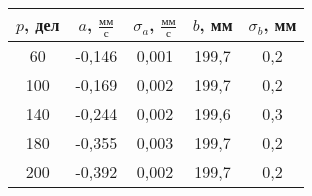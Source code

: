 \begin{tabular}[t]{|c|c|c|c|c|}
\hline
$p$, дел & $a$, $\frac{мм}{с}$ & $\sigma_a$, $\frac{мм}{с}$ & $b$, мм & $\sigma_b$, мм \\ 
\hline
60 & -0,146 & 0,001 & 199,7 & 0,2 \\ 
100 & -0,169 & 0,002 & 199,7 & 0,2 \\ 
140 & -0,244 & 0,002 & 199,6 & 0,3 \\ 
180 & -0,355 & 0,003 & 199,7 & 0,2 \\ 
200 & -0,392 & 0,002 & 199,7 & 0,2 \\ 
\hline
\end{tabular}
